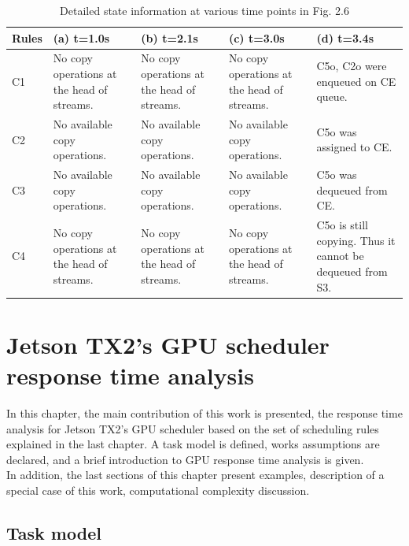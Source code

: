 \documentclass[
  12pt,
  a4paperpaper,
]{report}
\begin{document}
\begin{table}[hbtp]
\small
\begin{tabularx}{\linewidth}{|X|X|X|X|X|}
    \hline
Rules & (a) t=1.0s & (b) t=2.1s & (c) t=3.0s & (d) t=3.4s \\ \hline
C1 & No copy operations at the head of streams. & No copy operations at the head of streams. & No copy operations at the head of streams. & C5o, C2o were enqueued on CE queue. \\ \hline
C2 & No available copy operations. & No available copy operations. & No available copy operations. & C5o was assigned to CE. \\ \hline
C3 & No available copy operations. & No available copy operations. & No available copy operations. & C5o was dequeued from CE. \\ \hline
C4 & No copy operations at the head of streams. & No copy operations at the head of streams. & No copy operations at the head of streams. & C5o is still copying. Thus it cannot be dequeued from S3. \\ \hline
\end{tabularx}
\label{tab:scheduler_rules3}
\caption{Detailed state information at various time points in Fig. 2.6}
\end{table}




\newpage

\hypertarget{jetson-tx2s-gpu-scheduler-response-time-analysis}{%
\chapter{Jetson TX2's GPU scheduler response time
analysis}\label{jetson-tx2s-gpu-scheduler-response-time-analysis}}

In this chapter, the main contribution of this work is presented, the response time analysis for Jetson TX2's GPU scheduler based on the set of scheduling rules explained in the last chapter.
A task model is defined,  works assumptions are declared, and a brief introduction to GPU response time analysis is given.\\
In addition, the last sections of this chapter present examples, description of a special case of this work,  computational complexity discussion.

\hypertarget{task-model}{%
\section{Task model}\label{task-model}}
\end{document}
